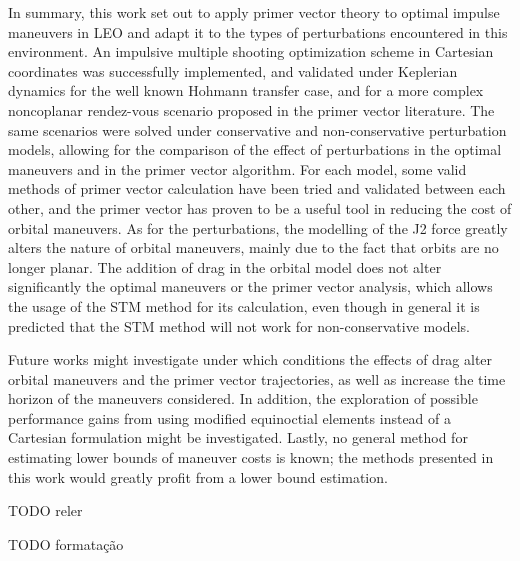 In summary, this work set out to apply primer vector theory to optimal impulse maneuvers in LEO and adapt it to the types of perturbations encountered in this environment. An impulsive multiple shooting optimization scheme in Cartesian coordinates was successfully implemented, and validated under Keplerian dynamics for the well known Hohmann transfer case, and for a more complex noncoplanar rendez-vous scenario proposed in the primer vector literature. The same scenarios were solved under conservative and non-conservative perturbation models, allowing for the comparison of the effect of perturbations in the optimal maneuvers and in the primer vector algorithm. For each model, some valid methods of primer vector calculation have been tried and validated between each other, and the primer vector has proven to be a useful tool in reducing the cost of orbital maneuvers. As for the perturbations, the modelling of the J2 force greatly alters the nature of orbital maneuvers, mainly due to the fact that orbits are no longer planar. The addition of drag in the orbital model does not alter significantly the optimal maneuvers or the primer vector analysis, which allows the usage of the STM method for its calculation, even though in general it is predicted that the STM method will not work for non-conservative models. 

Future works might investigate under which conditions the effects of drag alter orbital maneuvers and the primer vector trajectories, as well as increase the time horizon of the maneuvers considered. In addition, the exploration of possible performance gains from using modified equinoctial elements instead of a Cartesian formulation might be investigated. Lastly, no general method for estimating lower bounds of maneuver costs is known; the methods presented in this work would greatly profit from a lower bound estimation.

TODO reler

TODO formatação